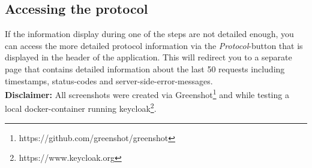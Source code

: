 \documentclass[english, letterpaper, 10 pt]{report}
\begin{document}
\subsection*{Accessing the protocol}

\noindent If the information display during one of the steps are not detailed enough, you can access the more detailed protocol information via the \textit{Protocol}-button that is displayed in the header of the application. This will redirect you to a separate page that contains detailed information about the last 50 requests including timestamps, status-codes and server-side-error-messages.
\\

\noindent \textbf{Disclaimer:} All screenshots were created via Greenshot\footnote{https://github.com/greenshot/greenshot} and while testing a local docker-container running keycloak\footnote{https://www.keycloak.org}.

%

\end{document}

